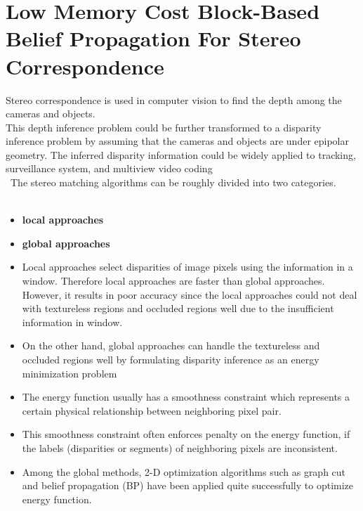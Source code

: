 \section{Low Memory Cost Block-Based Belief Propagation For Stereo Correspondence}

Stereo correspondence is used in computer vision to find the depth among the cameras and objects.\\ This depth inference problem could be further transformed  to  a disparity inference problem by assuming that the cameras and objects are under epipolar geometry. The inferred disparity information could be widely applied to tracking, surveillance system, and multiview video coding \\\
The stereo matching algorithms can be roughly divided into two categories.
\\\
\begin{itemize}
  \item \textbf{local approaches}
  \item \textbf{global approaches}
\end{itemize}
\begin{itemize}
  \item Local approaches select disparities of image pixels using the information in a window. Therefore local approaches are faster than global approaches. However, it results in poor accuracy since the local approaches could not deal with textureless regions and occluded regions well due to the insufficient information in window.
  \item On the other hand, global approaches can handle the textureless and occluded regions well by formulating disparity inference as an energy minimization problem
\end{itemize}

 \begin{itemize}
   \item The energy function usually has a smoothness constraint which represents a certain physical relationship between neighboring pixel pair.
   \item This  smoothness  constraint often enforces penalty on the energy function, if the labels (disparities or segments) of neighboring pixels are inconsistent.
   \item Among the global methods, 2-D optimization algorithms such as graph cut and belief propagation (BP)  have been applied quite successfully to optimize energy function.
\end{itemize}



